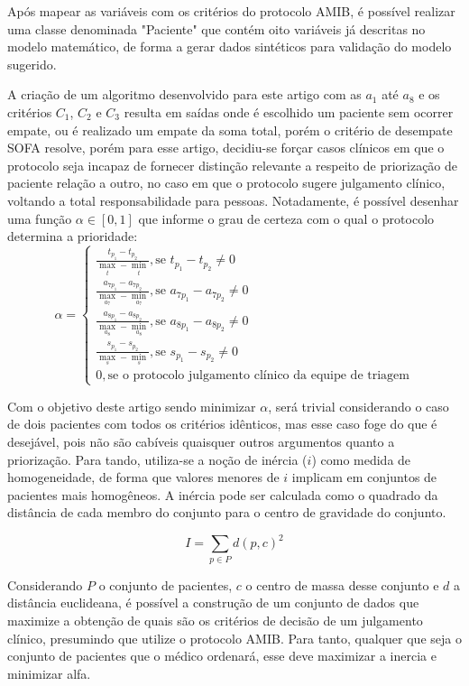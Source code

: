\documentclass[12pt]{article}
\begin{document}
Após mapear as variáveis com os critérios do protocolo AMIB, é possível realizar uma classe denominada "Paciente" que contém oito variáveis já descritas no modelo matemático, de forma a gerar dados sintéticos para validação do modelo sugerido.

A criação de um algoritmo desenvolvido para este artigo com as $a_1$ até $a_8$ e os critérios $C_1$, $C_2$ e $C_3$ resulta em saídas onde é escolhido um paciente sem ocorrer empate, ou é realizado um empate da soma total, porém o critério de desempate SOFA resolve, porém para esse artigo, decidiu-se forçar casos clínicos em que o protocolo seja incapaz de fornecer distinção relevante a respeito de priorização de paciente relação a outro, no caso em que o protocolo sugere julgamento clínico, voltando a total responsabilidade para pessoas.
Notadamente, é possível desenhar uma função $\alpha \in [0, 1]$ que informe o grau de certeza com o qual o protocolo determina a prioridade:
\[
\alpha = \begin{cases}
    \frac{t_{p_1} - t_{p_2}}{\max_t - \min_t}, \text{se } t_{p_1} - t_{p_2} \neq 0 \\
    \frac{a_{7p_1} - a_{7p_2}}{\max_{a_7} - \min_{a_7}}, \text{se } a_{7p_1} - a_{7p_2} \neq 0 \\
    \frac{a_{8p_1} - a_{8p_2}}{\max_{a_8} - \min_{a_8}}, \text{se } a_{8p_1} - a_{8p_2} \neq 0 \\
    \frac{s_{p_1} - s_{p_2}}{\max_s - \min_s}, \text{se } s_{p_1} - s_{p_2} \neq 0 \\
    0, \text{se o protocolo julgamento clínico da equipe de triagem}
\end{cases}
\] 

Com o objetivo deste artigo sendo minimizar $\alpha$, será trivial considerando o caso de dois pacientes com todos os critérios idênticos, mas esse caso foge do que é desejável, pois não são cabíveis quaisquer outros argumentos quanto a priorização.
Para tando, utiliza-se a noção de inércia ($i$) como medida de homogeneidade, de forma que valores menores de $i$ implicam em conjuntos de pacientes mais homogêneos.
A inércia pode ser calculada como o quadrado da distância de cada membro do conjunto para o centro de gravidade do conjunto.

\[
I = \sum_{p \in P}d(p, c)^2
\] 

Considerando $P$ o conjunto de pacientes, $c$ o centro de massa desse conjunto e $d$ a distância euclideana, é possível a construção de um conjunto de dados que maximize a obtenção de quais são os critérios de decisão de um julgamento clínico, presumindo que utilize o protocolo AMIB. Para tanto, qualquer que seja o conjunto de pacientes que o médico ordenará, esse deve maximizar a inercia e minimizar alfa.
\end{document}
